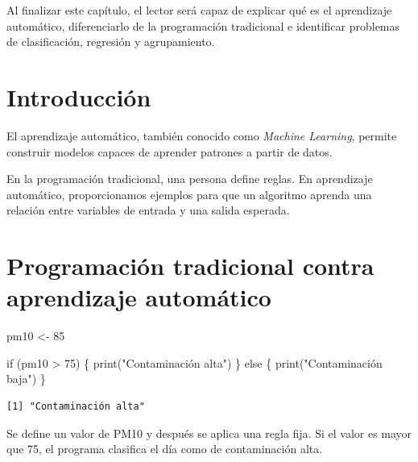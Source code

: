 \documentclass[
  spanish,
  11pt,
  letterpaper,
]{book}
\newenvironment{Shaded}{}{}
\newcommand{\ControlFlowTok}[1]{\textcolor[rgb]{0.84,0.23,0.29}{#1}}
\newcommand{\DecValTok}[1]{\textcolor[rgb]{0.00,0.36,0.77}{#1}}
\newcommand{\FunctionTok}[1]{\textcolor[rgb]{0.44,0.26,0.76}{#1}}
\newcommand{\NormalTok}[1]{\textcolor[rgb]{0.14,0.16,0.18}{#1}}
\newcommand{\OtherTok}[1]{\textcolor[rgb]{0.44,0.26,0.76}{#1}}
\newcommand{\SpecialCharTok}[1]{\textcolor[rgb]{0.00,0.36,0.77}{#1}}
\newcommand{\StringTok}[1]{\textcolor[rgb]{0.01,0.18,0.38}{#1}}
\begin{document}
Al finalizar este capítulo, el lector será capaz de explicar qué es el
aprendizaje automático, diferenciarlo de la programación tradicional e
identificar problemas de clasificación, regresión y agrupamiento.

\section{Introducción}\label{introducciuxf3n}

El aprendizaje automático, también conocido como \emph{Machine
Learning}, permite construir modelos capaces de aprender patrones a
partir de datos.

En la programación tradicional, una persona define reglas. En
aprendizaje automático, proporcionamos ejemplos para que un algoritmo
aprenda una relación entre variables de entrada y una salida esperada.

\section{Programación tradicional contra aprendizaje
automático}\label{programaciuxf3n-tradicional-contra-aprendizaje-automuxe1tico}

\begin{Shaded}
\begin{Highlighting}[]
\NormalTok{pm10 }\OtherTok{\textless{}{-}} \DecValTok{85}

\ControlFlowTok{if}\NormalTok{ (pm10 }\SpecialCharTok{\textgreater{}} \DecValTok{75}\NormalTok{) \{}
  \FunctionTok{print}\NormalTok{(}\StringTok{"Contaminación alta"}\NormalTok{)}
\NormalTok{\} }\ControlFlowTok{else}\NormalTok{ \{}
  \FunctionTok{print}\NormalTok{(}\StringTok{"Contaminación baja"}\NormalTok{)}
\NormalTok{\}}
\end{Highlighting}
\end{Shaded}

\begin{verbatim}
[1] "Contaminación alta"
\end{verbatim}

\begin{tcolorbox}[enhanced jigsaw, arc=.35mm, bottomrule=.15mm, bottomtitle=1mm, breakable, colback=white, colbacktitle=quarto-callout-note-color!10!white, colframe=quarto-callout-note-color-frame, coltitle=black, left=2mm, leftrule=.75mm, opacityback=0, opacitybacktitle=0.6, rightrule=.15mm, title=\textcolor{quarto-callout-note-color}{\faInfo}\hspace{0.5em}{Explicación del código}, titlerule=0mm, toprule=.15mm, toptitle=1mm]

Se define un valor de PM10 y después se aplica una regla fija. Si el
valor es mayor que 75, el programa clasifica el día como de
contaminación alta.

\end{tcolorbox}
\end{document}

